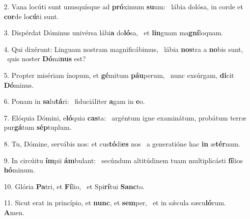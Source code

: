 2. Vana locúti sunt unusquísque ad \textbf{pró}ximum \textbf{su}um: \ast\  lábia dolósa, in corde et \textbf{cor}de lo\textbf{cú}ti sunt.\

3. Dispérdat Dóminus univérsa lábi\textbf{a} do\textbf{ló}sa, \ast\  et \textbf{lin}guam ma\textbf{gní}loquam.\

4. Qui dixérunt: Linguam nostram magnificábimus, \dag\  lábia \textbf{nos}tra a \textbf{no}bis sunt, \ast\  quis noster \textbf{Dó}mi\textbf{nus} est?\

5. Propter misériam ínopum, et \textbf{gé}mitum \textbf{páu}perum, \ast\  nunc exsúrgam, \textbf{di}cit \textbf{Dó}minus.\

6. Ponam in \textbf{sa}lu\textbf{tá}ri: \ast\  fiduciáliter \textbf{a}gam in \textbf{e}o.\

7. Elóquia Dómini, e\textbf{ló}quia \textbf{cas}ta: \ast\  argéntum igne examinátum, probátum terræ pur\textbf{gá}tum \textbf{sép}tuplum.\

8. Tu, Dómine, servábis nos: et cus\textbf{tó}di\textbf{es} nos \ast\  a generatióne hac \textbf{in} æ\textbf{tér}num.\

9. In circúitu \textbf{ím}pii \textbf{ám}bulant: \ast\  secúndum altitúdinem tuam multiplicásti \textbf{fí}lios \textbf{hó}minum.\

10. Glória \textbf{Pa}tri, et \textbf{Fí}lio, \ast\  et Spi\textbf{rí}tui \textbf{Sanc}to.\

11. Sicut erat in princípio, et \textbf{nunc}, et \textbf{sem}per, \ast\  et in sǽcula sæcu\textbf{ló}rum. \textbf{A}men.\

